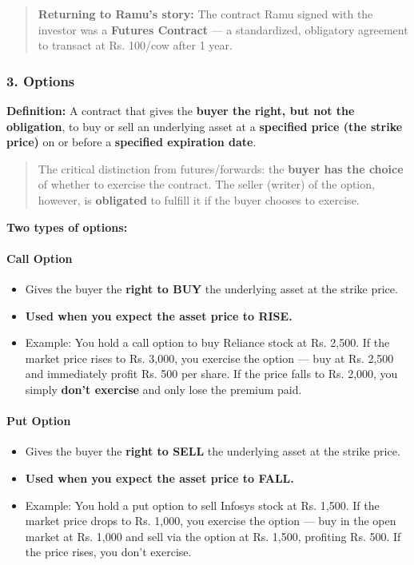 \documentclass[12pt,openany]{book}
\begin{document}
\begin{quote}
    \textbf{Returning to Ramu's story:} The contract Ramu signed with the investor was a \textbf{Futures Contract} --- a standardized, obligatory agreement to transact at Rs. 100/cow after 1 year.
\end{quote}

\subsubsection{3. Options}

\textbf{Definition:} A contract that gives the \textbf{buyer the right, but not the obligation}, to buy or sell an underlying asset at a \textbf{specified price (the strike price)} on or before a \textbf{specified expiration date}.

\begin{quote}
    The critical distinction from futures/forwards: the \textbf{buyer has the choice} of whether to exercise the contract. The seller (writer) of the option, however, is \textbf{obligated} to fulfill it if the buyer chooses to exercise.
\end{quote}

\textbf{Two types of options:}

\paragraph{Call Option}

\begin{itemize}[leftmargin=*]
    \item Gives the buyer the \textbf{right to BUY} the underlying asset at the strike price.
    \item \textbf{Used when you expect the asset price to RISE.}
    \item Example: You hold a call option to buy Reliance stock at Rs. 2,500. If the market price rises to Rs. 3,000, you exercise the option --- buy at Rs. 2,500 and immediately profit Rs. 500 per share. If the price falls to Rs. 2,000, you simply \textbf{don't exercise} and only lose the premium paid.
\end{itemize}

\paragraph{Put Option}

\begin{itemize}[leftmargin=*]
    \item Gives the buyer the \textbf{right to SELL} the underlying asset at the strike price.
    \item \textbf{Used when you expect the asset price to FALL.}
    \item Example: You hold a put option to sell Infosys stock at Rs. 1,500. If the market price drops to Rs. 1,000, you exercise the option --- buy in the open market at Rs. 1,000 and sell via the option at Rs. 1,500, profiting Rs. 500. If the price rises, you don't exercise.
\end{itemize}
\end{document}
